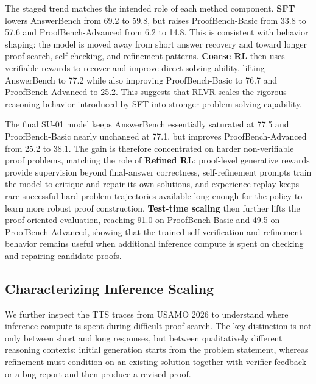 \documentclass{llmxive}
\begin{document}
The staged trend matches the intended role of each method component. \textbf{SFT} lowers
AnswerBench from 69.2 to 59.8, but raises ProofBench-Basic from 33.8 to 57.6
and ProofBench-Advanced from 6.2 to 14.8. This is consistent with behavior
shaping: the model is moved away from short answer recovery and toward longer
proof-search, self-checking, and refinement patterns. \textbf{Coarse RL} then uses
verifiable rewards to recover and improve direct solving ability, lifting
AnswerBench to 77.2 while also improving ProofBench-Basic to 76.7 and
ProofBench-Advanced to 25.2. This suggests that RLVR scales the rigorous
reasoning behavior introduced by SFT into stronger problem-solving capability.



The final SU-01 model keeps AnswerBench essentially saturated at 77.5 and ProofBench-Basic nearly unchanged at 77.1, but improves ProofBench-Advanced from 25.2 to 38.1. The gain is therefore concentrated on harder non-verifiable proof problems, matching the role of \textbf{Refined RL}: proof-level generative rewards provide
supervision beyond final-answer correctness, self-refinement prompts train the model to critique and repair its own solutions, and experience replay keeps rare
successful hard-problem trajectories available long enough for the policy to learn more robust proof construction. \textbf{Test-time scaling} then further lifts the
proof-oriented evaluation, reaching 91.0 on ProofBench-Basic and 49.5 on ProofBench-Advanced, showing that the trained self-verification and refinement behavior
remains useful when additional inference compute is spent on checking and repairing candidate proofs.


\subsection{Characterizing Inference Scaling}

We further inspect the TTS traces from USAMO 2026 to understand where inference
compute is spent during difficult proof search. The key distinction is not only
between short and long responses, but between qualitatively different reasoning
contexts: initial generation starts from the problem statement, whereas
refinement must condition on an existing solution together with verifier
feedback or a bug report and then produce a revised proof.
\end{document}
